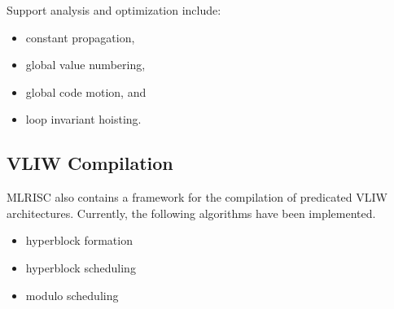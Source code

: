 Support analysis and optimization include:

  \begin{itemize}
    \item constant propagation,
    \item global value numbering,
    \item global code motion, and
    \item loop invariant hoisting.
  \end{itemize}

\subsection{VLIW Compilation}
  MLRISC also contains a framework for the compilation of 
predicated VLIW architectures.
Currently, the following algorithms have been implemented.
  \begin{itemize} 
    \item hyperblock formation
    \item hyperblock scheduling
    \item modulo scheduling
  \end{itemize}
